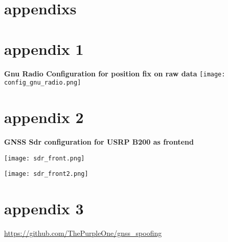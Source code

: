 \stopcontents[default]
\resumecontents[annexes]
\chapter*{appendixs}

\chapter*{appendix 1}

\begin{center}
	\textbf{Gnu Radio Configuration for position fix on raw data}
	\texttt{[image: config\_gnu\_radio.png]}
\end{center}


\chapter*{appendix 2}
\begin{center}
	\textbf{GNSS Sdr configuration for USRP B200 as frontend}
\end{center}
\begin{center}
	\texttt{[image: sdr\_front.png]}
\end{center}
\begin{center}
	\texttt{[image: sdr\_front2.png]}
\end{center}


\chapter*{appendix 3}
\begin{center}
	\url{https://github.com/ThePurpleOne/gnss_spoofing}
\end{center}



\stopcontents[annexes]
\resumecontents[default]
